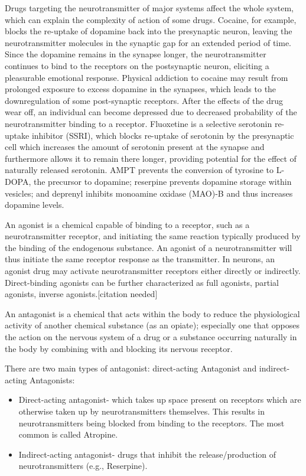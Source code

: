 \documentclass[]{book}
\providecommand{\tightlist}{%
  \setlength{\itemsep}{0pt}\setlength{\parskip}{0pt}}
\begin{document}
Drugs targeting the neurotransmitter of major systems affect the whole system, which can explain the complexity of action of some drugs. Cocaine, for example, blocks the re-uptake of dopamine back into the presynaptic neuron, leaving the neurotransmitter molecules in the synaptic gap for an extended period of time. Since the dopamine remains in the synapse longer, the neurotransmitter continues to bind to the receptors on the postsynaptic neuron, eliciting a pleasurable emotional response. Physical addiction to cocaine may result from prolonged exposure to excess dopamine in the synapses, which leads to the downregulation of some post-synaptic receptors. After the effects of the drug wear off, an individual can become depressed due to decreased probability of the neurotransmitter binding to a receptor. Fluoxetine is a selective serotonin re-uptake inhibitor (SSRI), which blocks re-uptake of serotonin by the presynaptic cell which increases the amount of serotonin present at the synapse and furthermore allows it to remain there longer, providing potential for the effect of naturally released serotonin. AMPT prevents the conversion of tyrosine to L-DOPA, the precursor to dopamine; reserpine prevents dopamine storage within vesicles; and deprenyl inhibits monoamine oxidase (MAO)-B and thus increases dopamine levels.

An agonist is a chemical capable of binding to a receptor, such as a neurotransmitter receptor, and initiating the same reaction typically produced by the binding of the endogenous substance. An agonist of a neurotransmitter will thus initiate the same receptor response as the transmitter. In neurons, an agonist drug may activate neurotransmitter receptors either directly or indirectly. Direct-binding agonists can be further characterized as full agonists, partial agonists, inverse agonists.{[}citation needed{]}

An antagonist is a chemical that acts within the body to reduce the physiological activity of another chemical substance (as an opiate); especially one that opposes the action on the nervous system of a drug or a substance occurring naturally in the body by combining with and blocking its nervous receptor.

There are two main types of antagonist: direct-acting Antagonist and indirect-acting Antagonists:

\begin{itemize}
\tightlist
\item
  Direct-acting antagonist- which takes up space present on receptors which are otherwise taken up by neurotransmitters themselves. This results in neurotransmitters being blocked from binding to the receptors. The most common is called Atropine.
\item
  Indirect-acting antagonist- drugs that inhibit the release/production of neurotransmitters (e.g., Reserpine).
\end{itemize}
\end{document}
